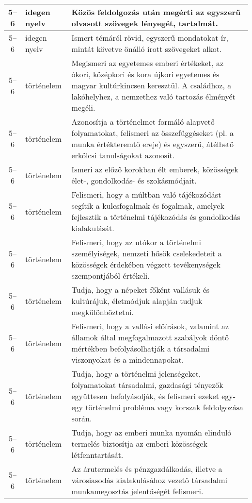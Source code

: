 \begin{small}
\begin{longtable}{c | p{2cm} |  p{11cm} }
              5--6 & idegen nyelv & Közös feldolgozás után megérti az egyszerű olvasott szövegek lényegét, tartalmát. \\ \hline
              5--6 & idegen nyelv & Ismert témáról rövid, egyszerű mondatokat ír, mintát követve önálló írott szövegeket alkot. \\ \hline
              5--6 & történelem & Megismeri az egyetemes emberi értékeket, az ókori, középkori és kora újkori egyetemes és magyar kultúrkincsen keresztül. A családhoz, a lakóhelyhez, a nemzethez való tartozás élményét megéli. \\ \hline
              5--6 & történelem & Azonosítja a történelmet formáló alapvető folyamatokat, felismeri az összefüggéseket (pl. a munka értékteremtő ereje) és egyszerű, átélhető erkölcsi tanulságokat azonosít. \\ \hline
              5--6 & történelem & Ismeri az előző korokban élt emberek, közösségek élet-, gondolkodás- és szokásmódjait. \\ \hline
              5--6 & történelem & Felismeri, hogy a múltban való tájékozódást segítik a kulcsfogalmak és fogalmak, amelyek fejlesztik a történelmi tájékozódás és gondolkodás kialakulását. \\ \hline
              5--6 & történelem & Felismeri, hogy az utókor a történelmi személyiségek, nemzeti hősök cselekedeteit a közösségek érdekében végzett tevékenységek szempontjából értékeli. \\ \hline
              5--6 & történelem & Tudja, hogy a népeket főként vallásuk és kultúrájuk, életmódjuk alapján tudjuk megkülönböztetni. \\ \hline
              5--6 & történelem & Felismeri, hogy a vallási előírások, valamint az államok által megfogalmazott szabályok döntő mértékben befolyásolhatják a társadalmi viszonyokat és a mindennapokat. \\ \hline
              5--6 & történelem & Tudja, hogy a történelmi jelenségeket, folyamatokat társadalmi, gazdasági tényezők együttesen befolyásolják, és felismeri ezeket egy-egy történelmi probléma vagy korszak feldolgozása során. \\ \hline
              5--6 & történelem & Tudja, hogy az emberi munka nyomán elinduló termelés biztosítja az emberi közösségek létfenntartását. \\ \hline
              5--6 & történelem & Az árutermelés és pénzgazdálkodás, illetve a városiasodás kialakulásához vezető társadalmi munkamegosztás jelentőségét felismeri. \\ \hline

\end{longtable}
\end{small}
